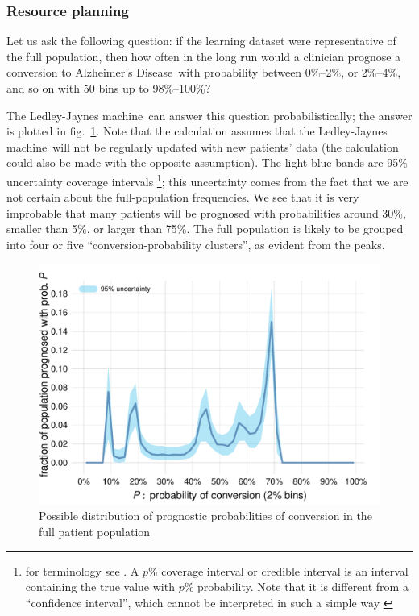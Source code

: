 \documentclass[utf8]{FrontiersinHarvard} %
\newcommand*{\sect}{\S}%
\newcommand*{\fig}{fig.}%
\renewcommand*{\|}[1][]{\nonscript\:#1\vert\nonscript\:\mathopen{}}
\newcommand*{\ad}{Alzheimer's Disease}
\newcommand*{\ljm}{Ledley-Jaynes machine}
\begin{document}
\subsubsection{Resource planning}
\label{sec:resource_planning}

Let us ask the following question: if the learning dataset were representative of the full population, then how often in the long run would a clinician prognose a conversion to \ad\ with probability between 0\%--2\%, or 2\%--4\%, and so on with 50 bins up to 98\%--100\%?

The \ljm\ can answer this question probabilistically; the answer is plotted in \fig~\ref{fig:progn_probs}. Note that the calculation assumes that the \ljm\ will not be regularly updated with new patients' data (the calculation could also be made with the opposite assumption). The light-blue bands are 95\% uncertainty coverage intervals \footnote{for terminology see \citet[C.2.30]{jcgm1993_r2008}. A $p$\% coverage interval or credible interval is an interval containing the true value with $p$\% probability. Note that it is different from a \enquote{confidence interval}, which cannot be interpreted in such a simple way \citetext{\citealp[pp.~165--166]{pratt1961}; \citealp{jaynes1976}; \citealp[\sect~37.3]{mackay1995_r2005}}}; this uncertainty comes from the fact that we are not certain about the full-population frequencies. We see that it is very improbable that many patients will be prognosed with probabilities around 30\%, smaller than 5\%, or larger than 75\%. The full population is likely to be grouped into four or five \enquote{conversion-probability clusters}, as evident from the peaks. %
\begin{figure}[h]%
  \centering%
\includegraphics[width=0.75\linewidth]{plotnextpatientconvprob.pdf}%
  \caption{Possible distribution of prognostic probabilities of conversion in the full patient population}\label{fig:progn_probs}
\end{figure}%
\end{document}
